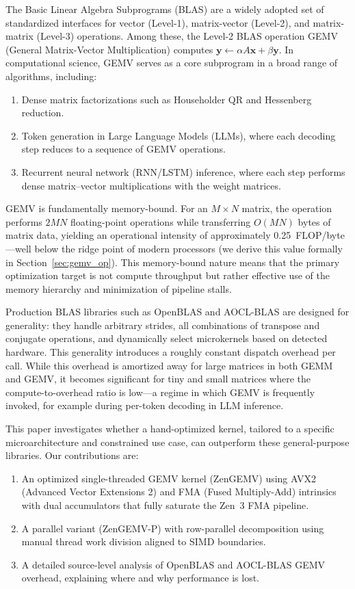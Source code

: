 \documentclass[runningheads]{llncs}
\begin{document}
The Basic Linear Algebra Subprograms (BLAS)\cite{blas} are a widely adopted set of standardized interfaces
for vector (Level-1), matrix-vector (Level-2), and matrix-matrix (Level-3) operations. Among these, the Level-2
BLAS operation GEMV (General Matrix-Vector Multiplication) computes
$\mathbf{y} \leftarrow \alpha A\mathbf{x} + \beta\mathbf{y}.$
In computational science, GEMV serves as a core subprogram in a broad range of algorithms, including:
\begin{enumerate}
  \item Dense matrix factorizations such as Householder QR and Hessenberg reduction\cite{golub2013}.
  \item Token generation in Large Language Models (LLMs), where each decoding step reduces to a sequence of GEMV operations.\cite{waferllm}
  \item Recurrent neural network (RNN/LSTM) inference\cite{grnn}, where each step performs dense matrix--vector multiplications with the weight matrices.
\end{enumerate}

GEMV is fundamentally memory-bound. For an
$M \times N$ matrix, the operation performs $2MN$ floating-point operations while
transferring $O(MN)$ bytes of matrix data, yielding an operational intensity of
approximately 0.25~FLOP/byte---well below the ridge point of modern
processors (we derive this value formally in
Section~\ref{sec:gemv_op}). This memory-bound nature means that the primary
optimization target is not compute throughput but rather effective use of the
memory hierarchy and minimization of pipeline stalls.

Production BLAS libraries such as OpenBLAS\cite{openblas} and
AOCL-BLAS\cite{aoclblas} are designed for generality: they handle arbitrary
strides, all combinations of transpose and conjugate operations, and dynamically
select microkernels based on detected hardware. This generality introduces a
roughly constant dispatch overhead per call. While this overhead is amortized
away for large matrices in both GEMM and GEMV, it becomes significant for tiny
and small matrices where the compute-to-overhead ratio is low---a regime in
which GEMV is frequently invoked, for example during per-token decoding in LLM
inference.

This paper investigates whether a hand-optimized kernel, tailored to a specific
microarchitecture and constrained use case, can outperform these general-purpose
libraries. Our contributions are:
\begin{enumerate}
  \item An optimized single-threaded GEMV kernel (ZenGEMV) using AVX2 (Advanced Vector Extensions 2)\cite{avx2} and FMA (Fused Multiply-Add)\cite{fma}
      intrinsics with dual accumulators that fully saturate the Zen~3\cite{zen3} FMA
      pipeline.
\item A parallel variant (ZenGEMV-P) with row-parallel decomposition using
      manual thread work division aligned to SIMD boundaries.
\item A detailed source-level analysis of OpenBLAS and AOCL-BLAS GEMV overhead,
      explaining where and why performance is lost.
\end{enumerate}
\end{document}
